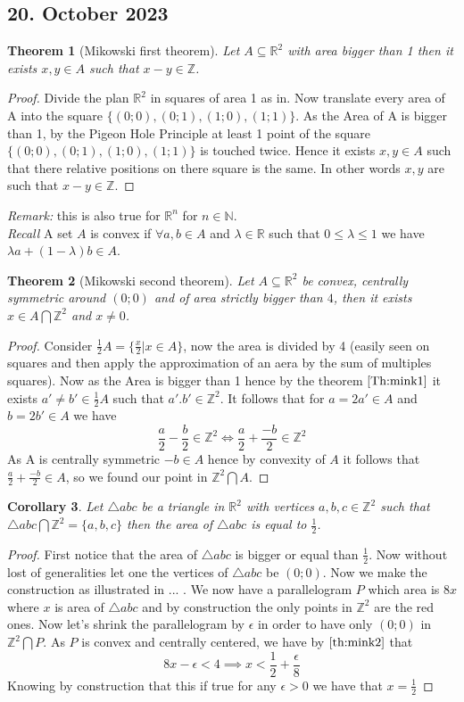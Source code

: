 \documentclass[a4paper,11pt,american]{article}
\newcommand{\N}{\mathbb{N}}
\newcommand{\R}{\mathbb{R}}
\newcommand{\Z}{\mathbb{Z}}
\theoremstyle{plain}
\newtheorem{theorem}{Theorem}
\newtheorem{corollary}[theorem]{Corollary}
\theoremstyle{definition}
\begin{document}
\subsection*{20. October 2023}
\begin{theorem}[Mikowski first theorem]\label{Th:mink1}
    Let $A\subseteq\R^2$ with area bigger than 1 then it exists $x,y\in A$ such that $x-y\in \Z$.
\end{theorem}
\begin{proof}
    Divide the plan $\R^2$ in squares of area 1 as in. Now translate every area of A into the square $\{(0;0), (0;1), (1;0),(1;1)\}$. As the Area of A is bigger than 1, by the Pigeon Hole Principle at least 1 point of the square $\{(0;0), (0;1), (1;0),(1;1)\}$ is touched twice. Hence it exists $x,y\in A$ such that there relative positions on there square is the same. In other words $x,y$ are such that $x-y\in \Z$.
\end{proof}
\emph{Remark:} this is also true for $\R^n$ for $n\in \N$.\\
\emph{Recall} A set $A$ is convex if $\forall a,b\in A$ and $\lambda\in \R$ such that $0\leq \lambda\leq1$ we have $\lambda a+(1-\lambda)b\in A$.
\begin{theorem}[Mikowski second theorem]\label{th:mink2}
    Let $A\subseteq \R^2$ be convex, centrally symmetric around $(0;0)$ and of area strictly bigger than $4$, then it exists $x\in A\bigcap \Z^2$ and $x\neq 0$.
\end{theorem}
\begin{proof}
    Consider $\frac{1}{2}A=\{\frac{x}{2}\vert x\in A\}$, now the area is divided by 4 (easily seen on squares and then apply the approximation of an aera by the sum of multiples squares). Now as the Area is bigger than 1 hence by the theorem $\eqref{Th:mink1}$ it exists $a'\neq b'\in \frac{1}{2}A$ such that $a'.b'\in\Z^2$. It follows that for $a=2a'\in A$ and $b=2b'\in A$ we have $$\frac{a}{2}-\frac{b}{2}\in \Z^2\iff \frac{a}{2}+\frac{-b}{2}\in \Z^2 $$ 
    As A is centrally symmetric $-b\in A$ hence by convexity of $A$ it follows that $\frac{a}{2}+\frac{-b}{2}\in A$, so we found our point in $\Z^2\bigcap A$.
\end{proof}
\begin{corollary}
    Let $\bigtriangleup abc$ be a triangle in $\R^2$ with vertices $a,b,c\in \Z^2$ such that $\bigtriangleup abc\bigcap\Z^2=\{a,b,c\}$ then the area of $\bigtriangleup abc$ is equal to $\frac{1}{2}$.
\end{corollary}
\begin{proof}
    First notice that the area of $\bigtriangleup abc$ is bigger or equal than $\frac{1}{2}$. Now without lost of generalities let one the vertices of $\bigtriangleup abc$ be $(0;0)$. Now we make the construction as illustrated in ... . We now have a parallelogram $P$ which area is $8x$ where $x$ is area of $\bigtriangleup abc$ and by construction the only points in $\Z^2$ are the red ones. Now let's shrink the parallelogram by $\epsilon$ in order to have only $(0;0)$ in $\Z^2\bigcap P$. As $P$ is convex and centrally centered, we have by $\eqref{th:mink2}$ that $$8x-\epsilon< 4\implies x<\frac{1}{2} +\frac{\epsilon}{8}$$
    Knowing by construction that this if true for any $\epsilon>0$ we have that $x=\frac{1}{2}$
\end{proof}
\end{document}
